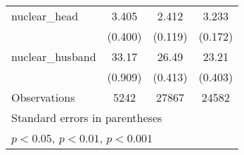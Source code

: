 {\begin{tabular}{l*{3}{c}}
\addlinespace
nuclear\_head        &       3.405\sym{***}&       2.412\sym{***}&       3.233\sym{***}\\
                    &     (0.400)         &     (0.119)         &     (0.172)         \\
\addlinespace
nuclear\_husband     &       33.17\sym{***}&       26.49\sym{***}&       23.21\sym{***}\\
                    &     (0.909)         &     (0.413)         &     (0.403)         \\
\midrule
Observations        &        5242         &       27867         &       24582         \\
\bottomrule
\multicolumn{4}{l}{\footnotesize Standard errors in parentheses}\\
\multicolumn{4}{l}{\footnotesize \sym{*} \(p<0.05\), \sym{**} \(p<0.01\), \sym{***} \(p<0.001\)}\\
\end{tabular}
}
